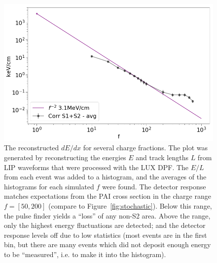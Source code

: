 \begin{figure}[htbp]
\begin{center}
\includegraphics[width=\textwidth]{figures/lips/dEdx_reconstructed.png}
\caption{The reconstructed $dE/dx$ for several charge fractions. The plot was generated by reconstructing the energies $E$ and track lengths $L$ from \acs{LIP} waveforms that were processed with the \acs{LUX} \acs{DPF}. The $E/L$ from each event was added to a histogram, and the averages of the histograms for each simulated $f$ were found. The detector response matches expectations from the \acs{PAI} cross section in the charge range $f = [50, 200]$ (compare to Figure~\ref{fig:stochastic}). Below this range, the pulse finder yields a ``loss'' of any non-S2 area. Above the range, only the highest energy fluctuations are detected; and the detector response levels off due to low statistics (most events are in the first bin, but there are many events which did not deposit enough energy to be ``measured'', i.e. to make it into the histogram). }
\label{fig:dEdx_reconstructed}
\end{center}
\end{figure}



\FloatBarrier
